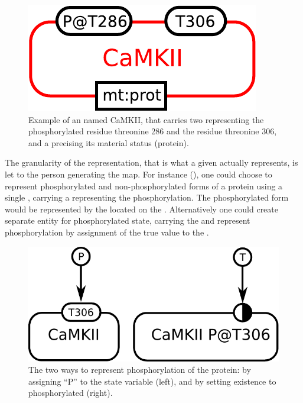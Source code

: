 
\begin{figure}[H]
  \centering
  \includegraphics[scale = 0.5]{examples/ex-entity}
  \caption{Example of an  named CaMKII, that carries two  representing the phosphorylated residue threonine 286 and the residue threonine 306, and a  precising its material status (protein).}
  \label{fig:ex-entity}
\end{figure}

The granularity of the representation, that is what a given  actually represents, is let to the person generating the map. For instance (), one could choose to represent phosphorylated and non-phosphorylated forms of a protein using a single , carrying a  representing the phosphorylation. The phosphorylated form would be represented by the  located on the . Alternatively one could create separate entity for phosphorylated state, carrying the   and represent phosphorylation by assignment of the true value to the  .

\begin{figure}[H]
  \centering
  \includegraphics[scale = 0.5]{images/entity-granularity}
  \caption{The two ways to represent phosphorylation of the protein: by assigning ``P'' to the state variable (left), and by setting existence to phosphorylated  (right).}
  \label{fig:entity-granularity}
\end{figure}

